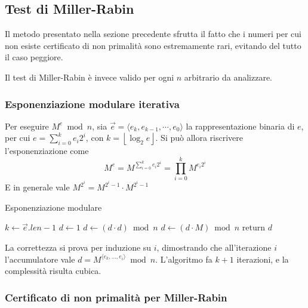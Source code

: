 \subsection{Test di Miller-Rabin}

Il metodo presentato nella sezione precedente sfrutta il fatto che i numeri per cui non esiste certificato di non primalità sono estremamente rari, evitando del tutto il caso peggiore.

Il test di Miller-Rabin è invece valido per ogni $n$ arbitrario da analizzare.

\subsubsection{Esponenziazione modulare iterativa}

Per eseguire $
M^e \bmod n 
$, sia  $
\vec{e}
=
\langle e_k, e_{k-1}, \cdots, e_0 \rangle
$ la rappresentazione binaria di $e$, per cui $
e =
\sum_{i=0}^{k} e_i 2^i
$, con $
k = \left\lfloor 
    \log_2 e
\right\rfloor
$.
Si può allora riscrivere l'esponenziazione come 
\begin{equation*}
    M^e =
    M^{
        \sum_{i=0}^{k} e_i 2^i
    }
    =
    \prod_{i=0}^{k} M^{
        e_i 2^i
    }
\end{equation*}
E in generale vale $
M^{2^i}
=
M^{2^i-1}
\cdot
M^{2^i-1}
$

\begin{algorithm}[H]
\caption{Esponenziazione modulare}\label{alg:exp_mod_iterativa}
\begin{algorithmic}[1]
        \State $k \gets \vec{e}.len -1$
        \State $d \gets 1$
            \State $d \gets \left( d \cdot d \right) \bmod n $
                \State $d \gets \left( d \cdot M \right) \bmod n $
            \EndIf
        \EndFor
        \State return $d$
    \EndProcedure
\end{algorithmic}
\end{algorithm}
La correttezza si prova per induzione su $i$, dimostrando che all'iterazione $i$ l'accumulatore vale $
d = M^{
    \langle e_k, \ldots, e_i \rangle
} \bmod n 
$.
L'algoritmo fa $k+1$ iterazioni, e la complessità risulta cubica.

\subsubsection{Certificato di non primalità per Miller-Rabin}


